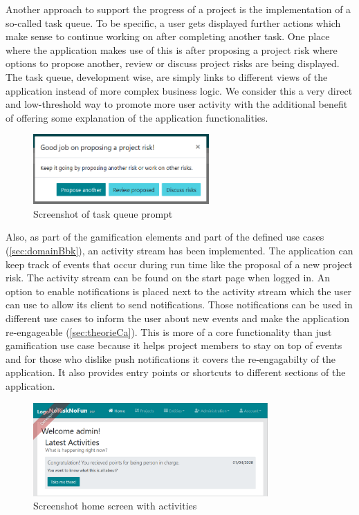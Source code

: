 Another approach to support the progress of a project is the implementation of a so-called task queue. To be specific, a user gets displayed further actions which make sense to continue working on after completing another task. One place where the application makes use of this is after proposing a project risk where options to propose another, review or discuss project risks are being displayed. The task queue, development wise, are simply links to different views of the application instead of more complex business logic. We consider this a very direct and low-threshold way to promote more user activity with the additional benefit of offering some explanation of the application functionalities.

\begin{figure}[H]
	\centering
	\includegraphics[width=0.6\textwidth]{Assets/implementation_shots/task_queue.png}
	\caption{Screenshot of task queue prompt}
	\label{fig:taskqueue}
\end{figure}

Also, as part of the gamification elements and part of the defined use cases (\ref{sec:domainBbk}), an activity stream has been implemented. The application can keep track of events that occur during run time like the proposal of a new project risk. The activity stream can be found on the start page when logged in. An option to enable notifications is placed next to the activity stream which the user can use to allow its client to send notifications. Those notifications can be used in different use cases to inform the user about new events and make the application re-engageable (\ref{sec:theorieCa}). This is more of a core functionality than just gamification use case because it helps project members to stay on top of events and for those who dislike push notifications it covers the re-engagabilty of the application. It also provides entry points or shortcuts to different sections of the application.

\begin{figure}[H]
	\centering
	\includegraphics[width=0.8\textwidth]{Assets/implementation_shots/activitystream.png}
	\caption{Screenshot home screen with activities}
	\label{fig:activitystream}
\end{figure}

